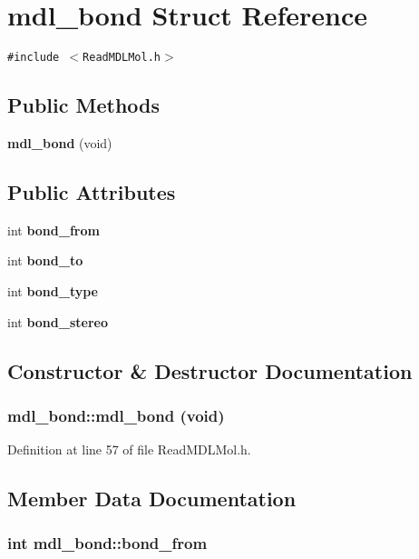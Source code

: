 \section{mdl\_\-bond  Struct Reference}
\label{structmdl__bond}
{\tt \#include $<$Read\-MDLMol.h$>$}

\subsection*{Public Methods}
\begin{CompactItemize}
\item 
{\bf mdl\_\-bond} (void)
\end{CompactItemize}
\subsection*{Public Attributes}
\begin{CompactItemize}
\item 
int {\bf bond\_\-from}
\item 
int {\bf bond\_\-to}
\item 
int {\bf bond\_\-type}
\item 
int {\bf bond\_\-stereo}
\end{CompactItemize}


\subsection{Constructor \& Destructor Documentation}
\subsubsection{\setlength{\rightskip}{0pt plus 5cm}mdl\_\-bond::mdl\_\-bond (void)\hspace{0.3cm}{\tt  [inline]}}\label{structmdl__bond_a0}




Definition at line 57 of file Read\-MDLMol.h.

\subsection{Member Data Documentation}
\subsubsection{\setlength{\rightskip}{0pt plus 5cm}int mdl\_\-bond::bond\_\-from}\label{structmdl__bond_m0}




